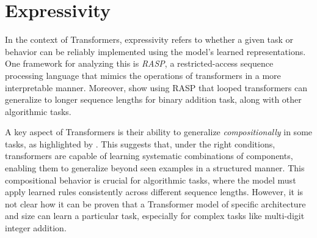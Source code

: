 
\section{Expressivity}\label{sec:expressivity}

In the context of Transformers, expressivity refers to whether a given task or behavior can be reliably implemented using the model's learned representations. One framework for analyzing this is \emph{RASP}, a restricted-access sequence processing language \parencite{weiss_thinking_2021} that mimics the operations of transformers in a more interpretable manner. Moreover, \cite{fan_looped_2024} show using RASP that looped transformers can generalize to longer sequence lengths for binary addition task, along with other algorithmic tasks.

A key aspect of Transformers is their ability to generalize \emph{compositionally} in some tasks, as highlighted by \cite{hupkes_compositionality_2020}. This suggests that, under the right conditions, transformers are capable of learning systematic combinations of components, enabling them to generalize beyond seen examples in a structured manner. This compositional behavior is crucial for algorithmic tasks, where the model must apply learned rules consistently across different sequence lengths. However, it is not clear how it can be proven that a Transformer model of specific architecture and size can learn a particular task, especially for complex tasks like multi-digit integer addition.



